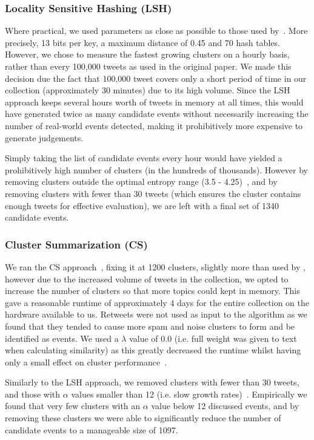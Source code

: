 \subsubsection{Locality Sensitive Hashing (LSH)}
Where practical, we used parameters as close as possible to those used by~\cite{Petrovic:2010:SFS:1857999.1858020}.
More precisely, 13 bits per key, a maximum distance of 0.45 and 70 hash tables.
However, we chose to measure the fastest growing clusters on a hourly basis, rather than every 100,000 tweets as used in the original paper.
We made this decision due the fact that 100,000 tweet covers only a short period of time in our collection (approximately 30 minutes) due to its high volume.
Since the LSH approach keeps several hours worth of tweets in memory at all times, this would have generated twice as many candidate events without necessarily increasing the number of real-world events detected, making it prohibitively more expensive to generate judgements.

Simply taking the list of candidate events every hour would have yielded a prohibitively high number of clusters (in the hundreds of thousands).
However by removing clusters outside the optimal entropy range (3.5 - 4.25)~\citep{Petrovic:2010:SFS:1857999.1858020}, and by removing clusters with fewer than 30 tweets (which ensures the cluster contains enough tweets for effective evaluation), we are left with a final set of 1340 candidate events.

\subsubsection{Cluster Summarization (CS)}
We ran the CS approach~\citep{Aggarwal12}, fixing it at 1200 clusters, slightly more than used by \cite{Aggarwal12}, however due to the increased volume of tweets in the collection, we opted to increase the number of clusters so that more topics could kept in memory.
This gave a reasonable runtime of approximately 4 days for the entire collection on the hardware available to us.
Retweets were not used as input to the algorithm as we found that they tended to cause more spam and noise clusters to form and be identified as events.
We used a \(\lambda\) value of 0.0 (i.e. full weight was given to text when calculating similarity) as this greatly decreased the runtime whilst having only a small effect on cluster performance~\citep{Aggarwal12}.

Similarly to the LSH approach, we removed clusters with fewer than 30 tweets, and those with \(\alpha\) values smaller than 12  (i.e. slow growth rates)~\citep{Aggarwal12}.
Empirically we found that very few clusters with an \(\alpha\) value below 12 discussed events, and by removing these clusters we were able to significantly reduce the number of candidate events to a manageable size of 1097.

